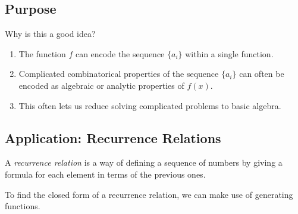 \documentclass[letterpaper]{article}
\begin{document}
\subsection{Purpose}
Why is this a good idea? 
\begin{enumerate}
    \item The function $f$ can encode the sequence $\{a_i\}$ within a single function. 
    \item Complicated combinatorical properties of the sequence $\{a_i\}$ can often be encoded as algebraic or analytic properties of $f(x)$. 
    \item This often lets us reduce solving complicated problems to basic algebra.  
\end{enumerate}


\subsection{Application: Recurrence Relations}
A \emph{recurrence relation} is a way of defining a sequence of numbers by giving a formula for each element in terms of the previous ones. 

\bigskip 

To find the closed form of a recurrence relation, we can make use of generating functions.
\end{document}
